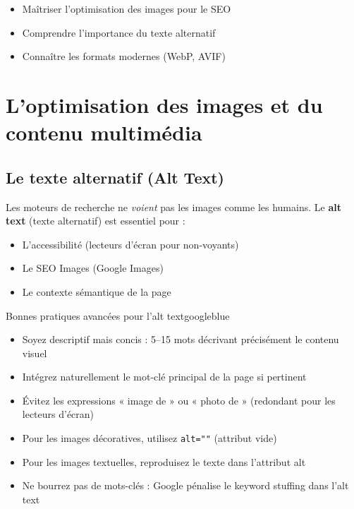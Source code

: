 \documentclass[12pt,a4paper,twoside]{report}
\newcommand{\keyword}[1]{\textbf{\textcolor{googleblue}{#1}}}
\newcommand{\level}[1]{\medskip\bigskip}
\begin{document}
\level{1}
\begin{objectives}
\begin{itemize}
    \item Maîtriser l'optimisation des images pour le SEO
    \item Comprendre l'importance du texte alternatif
    \item Connaître les formats modernes (WebP, AVIF)
\end{itemize}
\end{objectives}

\chapter{L'optimisation des images et du contenu multimédia}
\label{ch:images}

\section{Le texte alternatif (Alt Text)}

Les moteurs de recherche ne \textit{voient} pas les images comme les humains. Le \keyword{alt text} (texte alternatif) est essentiel pour :

\begin{itemize}
    \item L'accessibilité (lecteurs d'écran pour non-voyants)
    \item Le SEO Images (Google Images)
    \item Le contexte sémantique de la page
\end{itemize}

\begin{mybox}{Bonnes pratiques avancées pour l'alt text}{googleblue}
\begin{itemize}
    \item Soyez descriptif mais concis : 5--15 mots décrivant précisément le contenu visuel
    \item Intégrez naturellement le mot-clé principal de la page si pertinent
    \item Évitez les expressions « image de » ou « photo de » (redondant pour les lecteurs d'écran)
    \item Pour les images décoratives, utilisez \texttt{alt=""} (attribut vide)
    \item Pour les images textuelles, reproduisez le texte dans l'attribut alt
    \item Ne bourrez pas de mots-clés : Google pénalise le keyword stuffing dans l'alt text
\end{itemize}
\end{mybox}
\end{document}
